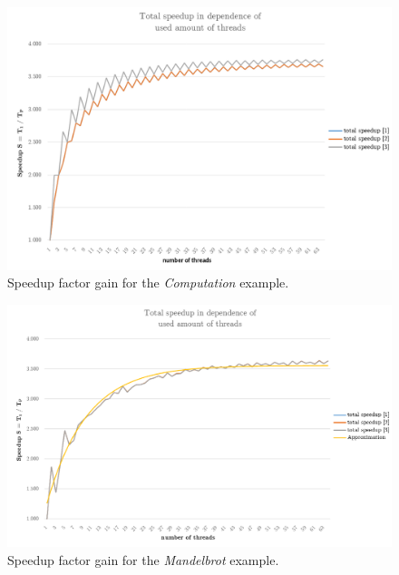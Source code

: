 \newpage

\begin{figure}[htbp]
	\centerline{\includegraphics[width=0.8\linewidth]{images/evaluation-computation.png}}
	\caption{ Speedup factor gain for the \textit{Computation} example. }
	\label{fig:resultsComputation}
\end{figure}  

\begin{figure}[htbp]
	\centerline{\includegraphics[width=0.8\linewidth]{images/evaluation-mandelbrot.png}}
	\caption{ Speedup factor gain for the \textit{Mandelbrot} example. }
	\label{fig:resultsMandelbrot}
\end{figure}  